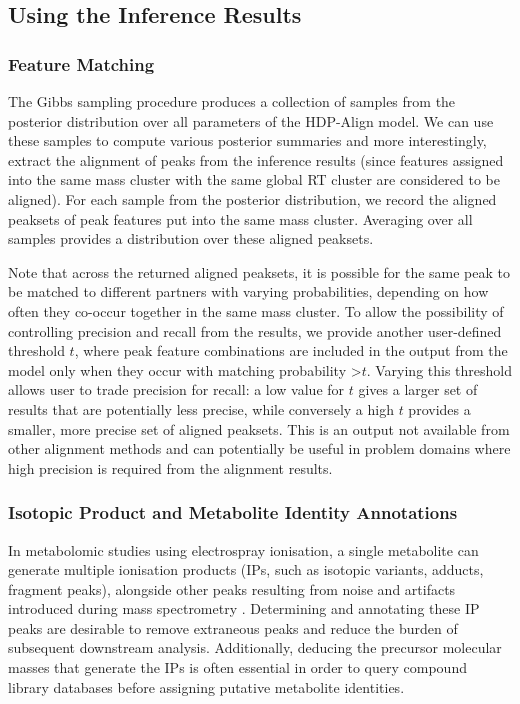 \subsection{Using the Inference Results}

\subsubsection{Feature Matching}
\label{subsub:feature-matching}

The Gibbs sampling procedure produces a collection of samples from the posterior distribution over all parameters of the HDP-Align model. We can use these samples to compute various posterior summaries and more interestingly, extract the alignment of peaks from the inference results (since features assigned into the same mass cluster with the same global RT cluster are considered to be aligned). For each sample from the posterior distribution, we record the aligned peaksets of peak features put into the same mass cluster. Averaging over all samples provides a distribution over these aligned peaksets. 

Note that across the returned aligned peaksets, it is possible for the same peak to be matched to different partners with varying probabilities, depending on how often they co-occur together in the same mass cluster. To allow the possibility of controlling precision and recall from the results, we provide another user-defined threshold $t$, where peak feature combinations are included in the output from the model only when they occur with matching probability \textgreater $t$. Varying this threshold allows user to trade precision for recall: a low value for $t$ gives a larger set of results that are potentially less precise, while conversely a high $t$ provides a smaller, more precise set of aligned peaksets. This is an output not available from other alignment methods and can potentially be useful in problem domains where high precision is required from the alignment results.

\subsubsection{Isotopic Product and Metabolite Identity Annotations}
\label{subsub:isotopic-product-annotations}

In metabolomic studies using electrospray ionisation, a single metabolite can generate multiple ionisation products (IPs, such as isotopic variants, adducts, fragment peaks), alongside other peaks resulting from noise and artifacts introduced during mass spectrometry \cite{Lee2013}. Determining and annotating these IP peaks are desirable to remove extraneous peaks and reduce the burden of subsequent downstream analysis. Additionally, deducing the precursor molecular masses that generate the IPs is often essential in order to query compound library databases before assigning putative metabolite identities. 

